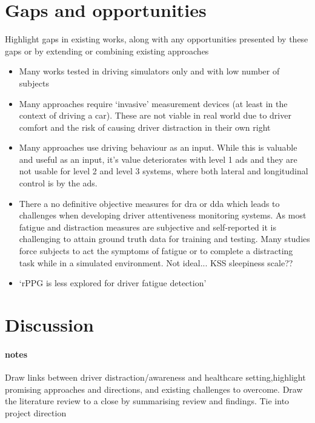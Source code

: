 \documentclass[11pt, parskip=half*,twoside=false]{scrbook}
\begin{document}
\section{Gaps and opportunities}
Highlight gaps in existing works, along with any opportunities presented by these gaps or by extending or combining existing approaches

\begin{itemize}
	\item Many works tested in driving simulators only and with low number of subjects
	\item Many approaches require `invasive' measurement devices (at least in the context of driving a car). These are not viable in real world due to driver comfort and the risk of causing driver distraction in their own right
	\item Many approaches use driving behaviour as an input. While this is valuable and useful as an input, it's value deteriorates with level 1 \gls{ads} and they are not usable for level 2 and level 3 systems, where both lateral and longitudinal control is by the \gls{ads}.
	\item There a no definitive objective measures for \gls{dra} or \gls{dda} which leads to challenges when developing driver attentiveness monitoring systems. As most fatigue and distraction measures are subjective and self-reported it is challenging to attain ground truth data for training and testing. Many studies force subjects to act the symptoms of fatigue or to complete a distracting task while in a simulated environment. Not ideal...  \citep{kaidaValidationKarolinskaSleepiness2006} KSS sleepiness scale??
	\item `rPPG is less explored for driver fatigue detection' \citet{sikanderDriverFatigueDetection2019}
\end{itemize}


\section{Discussion}
\paragraph{notes}
Draw links between driver distraction/awareness and healthcare setting,highlight promising approaches and directions, and existing challenges to overcome. Draw the literature review to a close by summarising review and findings. Tie into project direction
\end{document}
